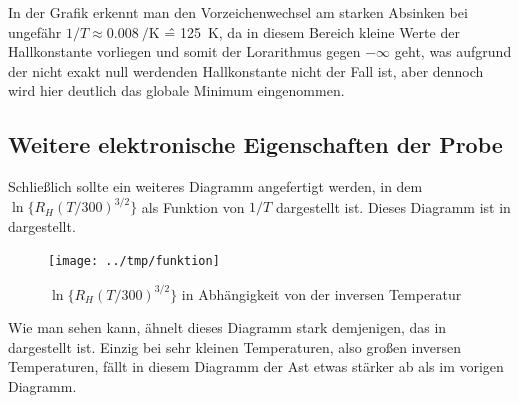 In der Grafik erkennt man den Vorzeichenwechsel am starken Absinken bei
ungefähr $1/T \approx \SI{0.008}{\per\kelvin}$ \^{=} \SI{125}{\kelvin}, da in
diesem Bereich kleine Werte der Hallkonstante vorliegen und somit der
Lorarithmus gegen $-\infty$ geht, was aufgrund der nicht exakt null werdenden
Hallkonstante nicht der Fall ist, aber dennoch wird hier deutlich das globale
Minimum eingenommen. 

\subsection{Weitere elektronische Eigenschaften der Probe}

Schließlich sollte ein weiteres Diagramm angefertigt werden, in dem
$\ln\{R_H(T/300)^{3/2}\}$ als Funktion von $1/T$ dargestellt ist. Dieses
Diagramm ist in  dargestellt.

\begin{figure}[htb]
   \centering
   \texttt{[image: ../tmp/funktion]}
   \caption{$\ln\{R_H(T/300)^{3/2}\}$ in Abhängigkeit von der inversen
   Temperatur}
   \label{fig:funktion}
\end{figure}

Wie man sehen kann, ähnelt dieses Diagramm stark demjenigen, das in
 dargestellt ist. Einzig bei sehr kleinen Temperaturen,
also großen inversen Temperaturen, fällt in diesem Diagramm der Ast etwas
stärker ab als im vorigen Diagramm.